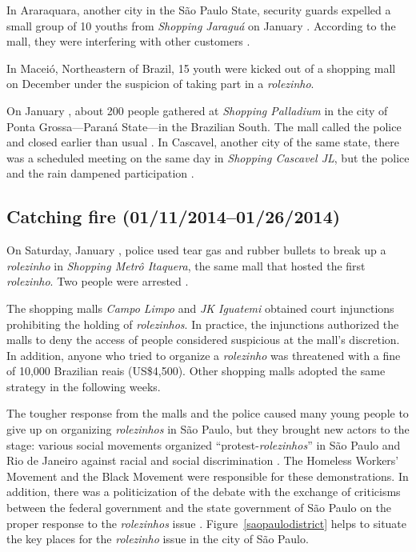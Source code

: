 In Araraquara, another city in the São Paulo State, security guards expelled a small group of 10 youths from \emph{Shopping Jaraguá} on January . According to the mall, they were interfering with other customers \autocite{araraquara}.

In Maceió, Northeastern of Brazil, 15 youth were kicked out of a shopping mall on December  \autocite{maceio} under the suspicion of taking part in a \emph{rolezinho}.

On January , about 200 people gathered at \emph{Shopping Palladium} in the city of Ponta Grossa---Paraná State---in the Brazilian South. The mall called the police and closed earlier than usual \autocite{arede_pontagrossa,gazeta_cascavel_pontagrossa}. In Cascavel, another city of the same state, there was a scheduled meeting on the same day in \emph{Shopping Cascavel JL}, but the police and the rain dampened participation \autocite{cgn_cascavel,gazeta_cascavel_pontagrossa}.

\subsection*{Catching fire (01/11/2014--01/26/2014)}

On Saturday, January , police used tear gas and rubber bullets to break up a \emph{rolezinho} in \emph{Shopping Metrô Itaquera}, the same mall that hosted the first \emph{rolezinho}. Two people were arrested \autocite{band_confronto_itaquera,folha_confronto_itaquera,ig_confronto_itaquera,estado_confronto_itaquera,g1_confronto_itaquera,r7_confronto_itaquera}.

The shopping malls \emph{Campo Limpo} \autocite{cartacapital_liminar_shoppings} and \emph{JK Iguatemi} \autocite{folha_liminar_shoppings,estado_liminar_shoppings,veja_liminar_shoppings,g1_liminar_shoppings,band_liminar_shoppings} obtained court injunctions prohibiting the holding of \emph{rolezinhos}. In practice, the injunctions authorized the malls to deny the access of people considered suspicious at the mall's discretion. In addition, anyone who tried to organize a \emph{rolezinho} was threatened with a fine of 10,000 Brazilian reais (US\$4,500). Other shopping malls adopted the same strategy in the following weeks.

The tougher response from the malls and the police caused many young people to give up on organizing \emph{rolezinhos} in São Paulo, but they brought new actors to the stage: various social movements organized ``protest-\emph{rolezinhos}'' in São Paulo and Rio de Janeiro against racial and social discrimination \autocite{estado_rolezinho_leblon, folha_rolezinho_leblon, veja_rolezinho_passeata}. The Homeless Workers' Movement \autocite{folha_semteto} and the Black Movement \autocite{folha_protesto_jk} were responsible for these demonstrations. In addition, there was a politicization of the debate with the exchange of criticisms between the federal government and the state government of São Paulo on the proper response to the \emph{rolezinhos} issue \autocite{folha_ministra_reacaobrancos,estado_rolezinho_oposicao}. Figure~\ref{saopaulodistrict} helps to situate the key places for the \emph{rolezinho} issue in the city of São Paulo.

